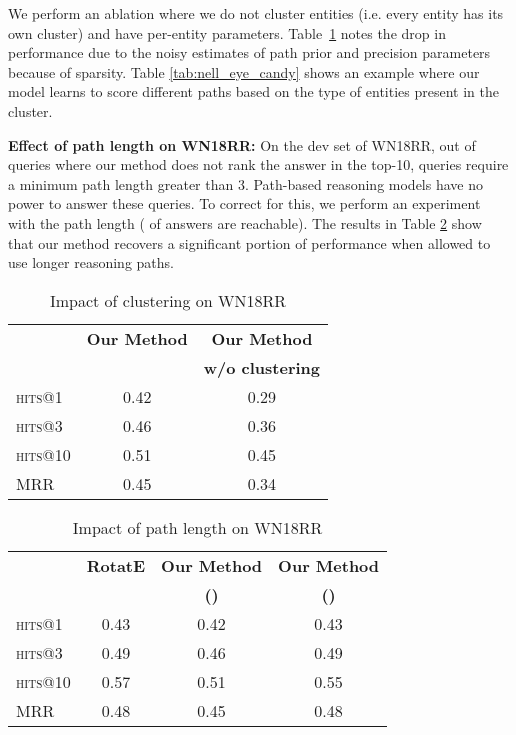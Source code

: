 \documentclass[11pt,a4paper]{article}
\newcommand{\wn}{WN18RR\xspace}
\begin{document}
We perform an ablation where we do not cluster entities (i.e. every entity has its own cluster) and have per-entity parameters. 
Table~\ref{tab:wn18rr_clustering} notes the drop in performance due to the noisy estimates of path prior and precision parameters because of sparsity. Table \ref{tab:nell_eye_candy} shows an example where our model learns to score different paths based on the type of entities present in the cluster.

\textbf{Effect of path length on \wn:} On the dev set of WN18RR, out of  queries where our method does not rank the answer in the top-10,  queries require a minimum path length greater than 3. Path-based reasoning models have no power to answer these queries. To correct for this, we perform an experiment with the path length  ( of  answers are reachable). The results in Table \ref{tab:wn18rr_pathlen} show that our method recovers a significant portion of performance when allowed to use longer reasoning paths.

\begin{table}
\centering
\small
\begin{tabular}{ l  c c}
\toprule
& \textbf{Our Method} & \textbf{Our Method}   \\ 
&  & \bf w/o clustering   \\
\midrule
  \textsc{hits}@1 & 0.42 & 0.29\\
  \textsc{hits}@3  & 0.46 & 0.36\\
  \textsc{hits}@10  & 0.51 & 0.45\\
  \textsc{MRR}   & 0.45 & 0.34\\
\bottomrule
\end{tabular}
\vspace{-2mm}
\caption{Impact of clustering on WN18RR}
\label{tab:wn18rr_clustering}
\end{table}

\begin{table}
\centering
\small
\begin{tabular}{ l c c c}
\toprule
& \textbf{RotatE} & \textbf{Our Method} & \textbf{Our Method}   \\
& & \textbf{()} & \textbf{()}   \\
\midrule
  \textsc{hits}@1 & 0.43 & 0.42 & 0.43\\
  \textsc{hits}@3  & 0.49 & 0.46 & 0.49\\
  \textsc{hits}@10  & 0.57 & 0.51 & 0.55\\
  \textsc{MRR}   & 0.48 & 0.45 & 0.48\\
\bottomrule
\end{tabular}
\vspace{-2mm}
\caption{Impact of path length on WN18RR}
\label{tab:wn18rr_pathlen}
\vspace{-4mm}
\end{table}
\end{document}
